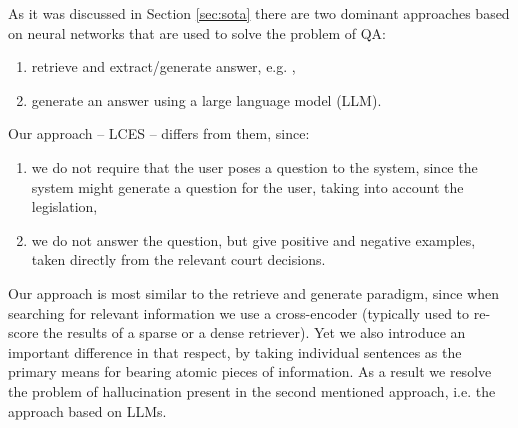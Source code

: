 As it was discussed in Section \ref{sec:sota} there are two dominant approaches 
based on neural networks that are used to solve the problem of QA:
\begin{enumerate}
  \item retrieve and extract/generate answer, e.g. , %
  \item generate an answer using a large language model (LLM). %
\end{enumerate}
Our approach -- LCES -- differs from them, since:
\begin{enumerate}
  \item we do not require that the user poses a question to the system, since the system might generate a question for the user,
    taking into account the legislation,
  \item we do not answer the question, but give positive and negative examples, taken directly from the relevant court decisions.
\end{enumerate}
Our approach is most similar to the retrieve and generate paradigm, since when searching for relevant information we use
a cross-encoder (typically used to re-score the results of a sparse or a dense retriever). Yet we also introduce an important
difference in that respect, by taking individual sentences as the primary means for bearing atomic pieces of information.  
As a result we resolve the problem of hallucination present in the second mentioned approach, i.e. the approach based on LLMs.

